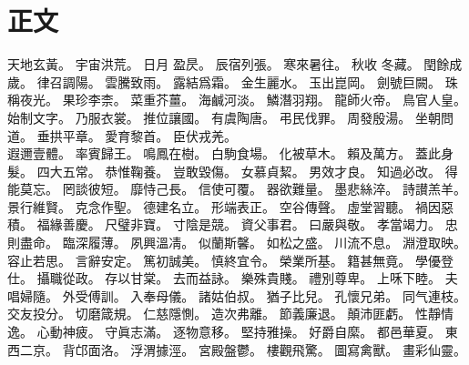 %
%
\chapter{正文}%

\thispagestyle{chapter}%
天地玄黃。%
宇宙洪荒。%
日月%
盈昃。%
辰宿列張。%
寒來暑往。%
秋收%
冬藏。%
閏餘成歲。%
律召調陽。%
雲騰致雨。%
露結爲霜。%
金生麗水。%
玉出崑岡。%
劍號巨闕。%
珠稱夜光。%
果珍李柰。%
菜重芥薑。%
海鹹河淡。%
鱗潛羽翔。%
龍師火帝。%
鳥官人皇。%
始制文字。%
乃服衣裳。%
推位讓國。%
有虞陶唐。%
弔民伐罪。%
周發殷湯。%
坐朝問道。%
垂拱平章。%
愛育黎首。%
臣伏戎羌。%
\\[\baselineskip]
遐邇壹體。%
率賓歸王。%
鳴鳳在樹。%
白駒食場。%
化被草木。%
賴及萬方。%
蓋此身髮。%
四大五常。%
恭惟鞠養。%
豈敢毀傷。%
女慕貞絜。%
男效才良。%
知過必改。%
得能莫忘。%
罔談彼短。%
靡恃己長。%
信使可覆。%
器欲難量。%
墨悲絲淬。%
詩讃羔羊。%
景行維賢。%
克念作聖。%
德建名立。%
形端表正。%
空谷傳聲。%
虛堂習聽。%
禍因惡積。%
福緣善慶。%
尺璧非寶。%
寸陰是競。%
資父事君。%
曰嚴與敬。%
孝當竭力。%
忠則盡命。%
臨深履薄。%
夙興溫凊。%
似蘭斯馨。%
如松之盛。%
川流不息。%
淵澄取映。%
容止若思。%
言辭安定。%
篤初誠美。%
慎終宜令。%
榮業所基。%
籍甚無竟。%
學優登仕。%
攝職從政。%
存以甘棠。%
去而益詠。%
樂殊貴賤。%
禮別尊卑。%
上咊下睦。%
夫唱婦隨。%
外受傅訓。%
入奉母儀。%
諸姑伯叔。%
猶子比兒。%
孔懷兄弟。%
同气連枝。%
交友投分。%
切磨箴規。%
仁慈隱惻。%
造次弗離。%
節義廉退。%
顛沛匪虧。%
性靜情逸。%
心動神疲。%
守眞志滿。%
逐物意移。%
堅持雅操。%
好爵自縻。%
都邑華夏。%
東西二京。%
背邙面洛。%
浮渭據涇。%
宮殿盤鬱。%
樓觀飛驚。%
圖寫禽獸。%
畫彩仙靈。%

